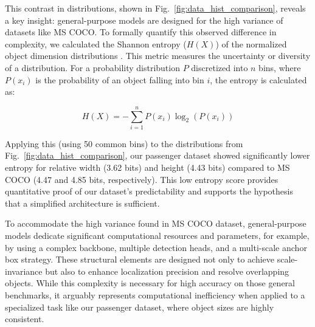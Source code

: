 \documentclass[journal,twoside,web]{ieeecolor}
\begin{document}

This contrast in distributions, shown in Fig.~\ref{fig:data_hist_comparison}, reveals a key insight: general-purpose models are designed for the high variance of datasets like \ac{MS COCO}.
To formally quantify this observed difference in complexity, we calculated the Shannon entropy ($H(X)$) of the normalized object dimension distributions \cite{bromiley2004shannon}. 
This metric measures the uncertainty or diversity of a distribution. 
For a probability distribution $P$ discretized into $n$ bins, where $P(x_i)$ is the probability of an object falling into bin $i$, the entropy is calculated as:

\begin{equation}
\label{eq:entropy}H(X) = - \sum_{i=1}^{n} P(x_i) \log_2(P(x_i))
\end{equation}

Applying this (using 50 common bins) to the distributions from Fig.~\ref{fig:data_hist_comparison}, our passenger dataset showed significantly lower entropy for relative width (3.62 bits) and height (4.43 bits) compared to \ac{MS COCO} (4.47 and 4.85 bits, respectively). This low entropy score provides quantitative proof of our dataset's predictability and supports the hypothesis that a simplified architecture is sufficient.






To accommodate the high variance found in \ac{MS COCO} dataset, general-purpose models dedicate significant computational resources and parameters, for example, by using a complex backbone, multiple detection heads, and a multi-scale anchor box strategy.
These structural elements are designed not only to achieve scale-invariance but also to enhance localization precision and resolve overlapping objects.
While this complexity is necessary for high accuracy on those general benchmarks, it arguably represents computational inefficiency when applied to a specialized task like our passenger dataset, where object sizes are highly consistent. 
\end{document}
